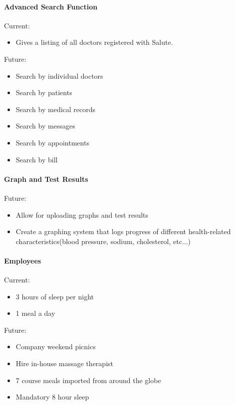 \documentclass[12pt]{report}
\begin{document}
\paragraph{Advanced Search Function}
Current:
\begin{itemize}
\item Gives a listing of all doctors registered with Salute.
\end{itemize}

Future: 
\begin{itemize}
\item Search by individual doctors 
\item Search by patients
\item Search by medical records 
\item Search by messages
\item Search by appointments
\item Search by bill
\end{itemize}

\paragraph{Graph and Test Results}
Future: 
\begin{itemize}
\item Allow for uploading graphs and test results
\item Create a graphing system that logs progress of different health-related characteristics(blood pressure, sodium, cholesterol, etc...)
\end{itemize}

\paragraph{Employees}

Current:
\begin{itemize}
\item 3 hours of sleep per night
\item 1 meal a day
\end{itemize}

Future:
\begin{itemize}
\item Company weekend picnics
\item Hire in-house massage therapist
\item 7 course meals imported from around the globe
\item Mandatory 8 hour sleep
\end{itemize}
\end{document}
